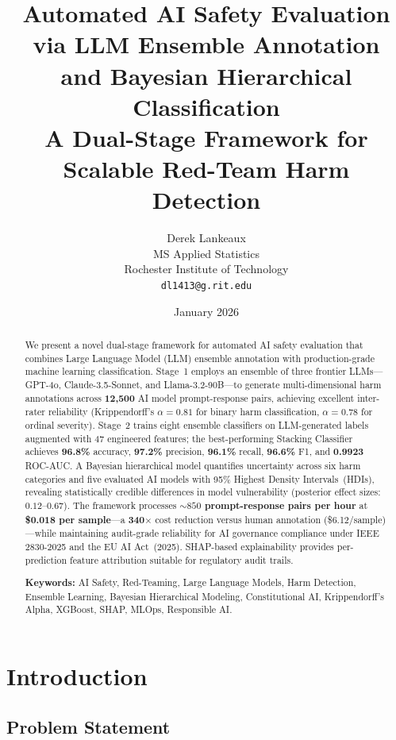 \documentclass[10pt,letterpaper]{article}
\title{\textbf{Automated AI Safety Evaluation via LLM Ensemble Annotation\\
and Bayesian Hierarchical Classification}\\[4pt]
\large A Dual-Stage Framework for Scalable Red-Team Harm Detection}
\author{
  Derek Lankeaux\\
  MS Applied Statistics\\
  Rochester Institute of Technology\\
  \texttt{dl1413@g.rit.edu}
}
\date{January 2026}
\begin{document}
\maketitle

\begin{abstract}
We present a novel dual-stage framework for automated AI safety evaluation that
combines Large Language Model (LLM) ensemble annotation with production-grade
machine learning classification.  Stage~1 employs an ensemble of three frontier
LLMs---GPT-4o, Claude-3.5-Sonnet, and Llama-3.2-90B---to generate
multi-dimensional harm annotations across \textbf{12,500} AI model prompt-response
pairs, achieving excellent inter-rater reliability (Krippendorff's $\alpha = 0.81$
for binary harm classification, $\alpha = 0.78$ for ordinal severity).  Stage~2
trains eight ensemble classifiers on LLM-generated labels augmented with 47
engineered features; the best-performing Stacking Classifier achieves
\textbf{96.8\%} accuracy, \textbf{97.2\%} precision, \textbf{96.1\%} recall,
\textbf{96.6\%} F1, and \textbf{0.9923} ROC-AUC.  A Bayesian hierarchical model
quantifies uncertainty across six harm categories and five evaluated AI models
with 95\% Highest Density Intervals~(HDIs), revealing statistically credible
differences in model vulnerability (posterior effect sizes: $0.12$--$0.67$).
The framework processes \textbf{${\sim}850$ prompt-response pairs per hour}
at \textbf{\$0.018 per sample}---a \textbf{340$\times$} cost reduction versus
human annotation (\$6.12/sample)---while maintaining audit-grade reliability
for AI governance compliance under IEEE 2830-2025 and the EU AI Act~(2025).
SHAP-based explainability provides per-prediction feature attribution suitable
for regulatory audit trails.

\medskip\noindent
\textbf{Keywords:} AI Safety, Red-Teaming, Large Language Models, Harm
Detection, Ensemble Learning, Bayesian Hierarchical Modeling, Constitutional
AI, Krippendorff's Alpha, XGBoost, SHAP, MLOps, Responsible AI.
\end{abstract}

\section{Introduction}
\label{sec:intro}

\subsection{Problem Statement}
\end{document}
